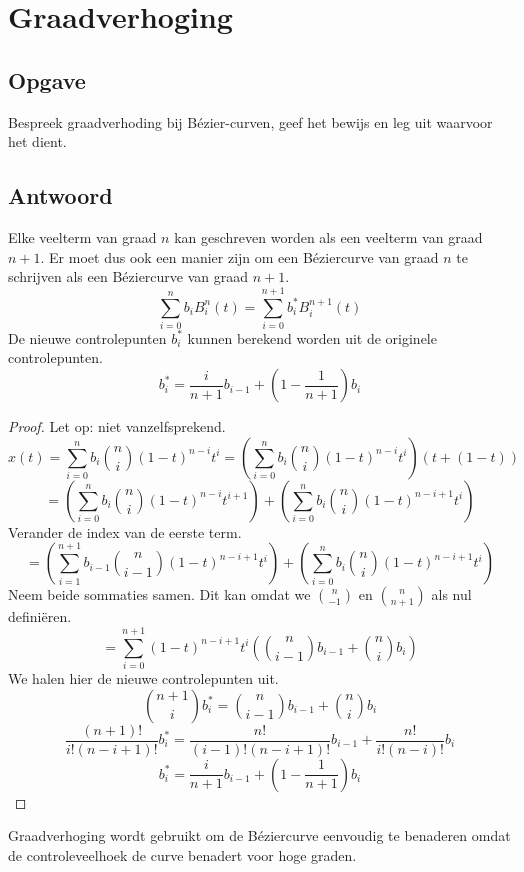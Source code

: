 \documentclass[examenvragen.tex]{subfiles}
\begin{document}
\section{Graadverhoging}
\subsection{Opgave}
Bespreek graadverhoding bij B\'ezier-curven, geef het bewijs en leg uit waarvoor het dient.

\subsection{Antwoord}
Elke veelterm van graad $n$ kan geschreven worden als een veelterm van graad $n+1$. Er moet dus ook een manier zijn om een B\'eziercurve van graad $n$ te schrijven als een B\'eziercurve van graad $n+1$.
\[
\sum_{i=0}^{n}b_iB_{i}^{n}(t) = \sum_{i=0}^{n+1}b_i^*B_{i}^{n+1}(t)
\]
De nieuwe controlepunten $b_i^*$ kunnen berekend worden uit de originele controlepunten.
\[
b^*_i= \frac{i}{n+1}b_{i-1} + \left(1-\frac{1}{n+1}\right)b_i
\]
\begin{proof}
Let op: niet vanzelfsprekend.
\[
x(t)
= \sum_{i=0}^{n}b_i\binom{n}{i}(1-t)^{n-i}t^{i}
= \left(\sum_{i=0}^{n}b_i\binom{n}{i}(1-t)^{n-i}t^{i}\right) (t+(1-t))
\]
\[
= \left(\sum_{i=0}^{n}b_i\binom{n}{i}(1-t)^{n-i}t^{i+1}\right)
+ \left(\sum_{i=0}^{n}b_i\binom{n}{i}(1-t)^{n-i+1}t^{i}\right)
\]
Verander de index van de eerste term.
\[
= \left(\sum_{i=1}^{n+1}b_{i-1}\binom{n}{i-1}(1-t)^{n-i+1}t^{i}\right)
+ \left(\sum_{i=0}^{n}b_i\binom{n}{i}(1-t)^{n-i+1}t^{i}\right)
\]
Neem beide sommaties samen. Dit kan omdat we $\binom{n}{-1}$ en $\binom{n}{n+1}$ als nul defini\"eren.
\[
= \sum_{i=0}^{n+1}(1-t)^{n-i+1}t^{i} \left(\binom{n}{i-1}b_{i-1} + \binom{n}{i}b_i\right)
\]
We halen hier de nieuwe controlepunten uit.
\[
\binom{n+1}{i}b_{i}^{*}
= \binom{n}{i-1}b_{i-1}
+ \binom{n}{i}b_i
\]
\[
\frac{(n+1)!}{i!(n-i+1)!}b_{i}^{*}
= \frac{n!}{(i-1)!(n-i+1)!} b_{i-1}
+ \frac{n!}{i!(n-i)!}b_i
\]
\[
b_{i}^{*}
= \frac{i}{n+1} b_{i-1}
+ \left(1-\frac{1}{n+1}\right)b_i
\]
\end{proof}
\noindent Graadverhoging wordt gebruikt om de B\'eziercurve eenvoudig te benaderen omdat de controleveelhoek de curve benadert voor hoge graden.
\end{document}
